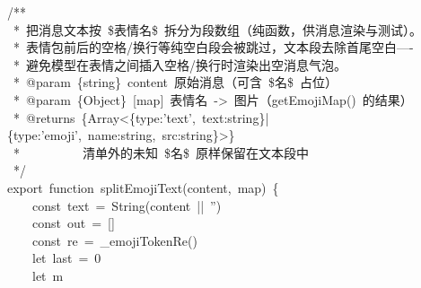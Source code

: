 \documentclass[a4paper,10pt]{article}
\begin{document}
{/**\\
~*~把消息文本按~\$表情名\$~拆分为段数组（纯函数，供消息渲染与测试）。\\
~*~表情包前后的空格/换行等纯空白段会被跳过，文本段去除首尾空白----\\
~*~避免模型在表情之间插入空格/换行时渲染出空消息气泡。\\
~*~@param~\{string\}~content~原始消息（可含~\$名\$~占位）\\
~*~@param~\{Object\}~[map]~表情名~->~图片（getEmojiMap()~的结果）\\
~*~@returns~\{Array<\{type:'text',~text:string\}|\{type:'emoji',~name:string,~src:string\}>\}\\
~*~~~~~~~~~~清单外的未知~\$名\$~原样保留在文本段中\\
~*/\\
export~function~splitEmojiText(content,~map)~\{\\
~~~~const~text~=~String(content~||~'')\\
~~~~const~out~=~[]\\
~~~~const~re~=~\_emojiTokenRe()\\
~~~~let~last~=~0\\
~~~~let~m
}

\newpage
\end{document}
